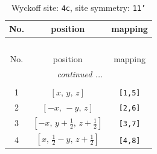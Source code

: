 \documentclass[fleqn,8pt]{jsarticle}
\begin{document}
\renewcommand{\arraystretch}{1.2}
\begin{longtable}{ccc}
\caption{Wyckoff site: {\tt 4c}, site symmetry: {\tt 11'}}
 \\
 \hline \hline
No. & position & mapping \\ \hline \endfirsthead

\multicolumn{2}{l}{\tablename\ \thetable{}} \\
 \hline \hline
No. & position & mapping \\ \hline \endhead

 \hline \hline
\multicolumn{2}{r}{\footnotesize\it continued ...} \\ \endfoot

 \hline \hline
\multicolumn{2}{r}{} \\ \endlastfoot

1 & $\left[ x,\, y,\, z \right]$ & {\tt [1,5]} \\ \hline
2 & $\left[ - x,\, - y,\, z \right]$ & {\tt [2,6]} \\ \hline
3 & $\left[ - x,\, y + \frac{1}{2},\, z + \frac{1}{2} \right]$ & {\tt [3,7]} \\ \hline
4 & $\left[ x,\, \frac{1}{2} - y,\, z + \frac{1}{2} \right]$ & {\tt [4,8]} \\
\end{longtable}
\end{document}
